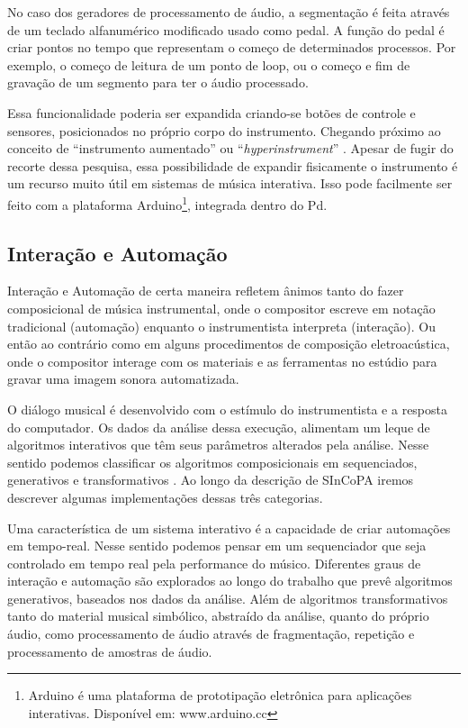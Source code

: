 \documentclass{ppgmus}
\begin{document}
No caso dos geradores de processamento de áudio, a segmentação é feita 
através de um teclado alfanumérico modificado usado como pedal. A função
do pedal é criar pontos no tempo que representam o começo de determinados
processos. Por exemplo, o começo de leitura de um ponto de loop, ou o começo
e fim de gravação de um segmento para ter o áudio processado.

Essa funcionalidade poderia ser expandida criando-se botões de controle
e sensores, posicionados no próprio corpo do instrumento. Chegando próximo ao conceito
de ``instrumento aumentado'' ou ``\textit{hyperinstrument}'' \cite{hyperinstrumento}. 
Apesar de fugir do recorte dessa pesquisa, essa possibilidade
de expandir fisicamente o instrumento é um recurso muito útil em sistemas de
música interativa. Isso pode facilmente ser feito com a plataforma Arduino\footnote{Arduino
é uma plataforma de prototipação eletrônica para aplicações interativas. Disponível em: 
www.arduino.cc}, integrada dentro do Pd. 




\subsection{Interação e Automação}

Interação e Automação de certa maneira refletem ânimos tanto do
fazer composicional de música instrumental, onde o compositor
escreve em notação tradicional (automação) enquanto o instrumentista
interpreta (interação). Ou então ao contrário como em alguns procedimentos
de composição eletroacústica, onde o compositor interage com os materiais
e as ferramentas no estúdio para gravar uma imagem sonora automatizada.

O diálogo musical é desenvolvido com o estímulo
do instrumentista e a resposta do computador. Os dados
da análise dessa execução, alimentam um leque de algoritmos
interativos que têm seus parâmetros alterados pela análise.
Nesse sentido podemos classificar os algoritmos composicionais
em sequenciados, generativos e transformativos \cite{rowe93:interactive}.
Ao longo da descrição de SInCoPA iremos descrever algumas implementações
dessas três categorias.

Uma característica de um sistema interativo é a capacidade de criar
automações em tempo-real. Nesse sentido podemos pensar em um sequenciador
que seja controlado em tempo real pela performance do músico.
Diferentes graus de interação e automação são explorados ao longo do
trabalho que prevê algoritmos generativos, baseados nos dados da análise. 
Além de algoritmos transformativos tanto do material musical simbólico,
abstraído da análise, quanto do próprio áudio, como processamento de áudio
através de fragmentação, repetição e processamento de amostras de áudio.
\end{document}
